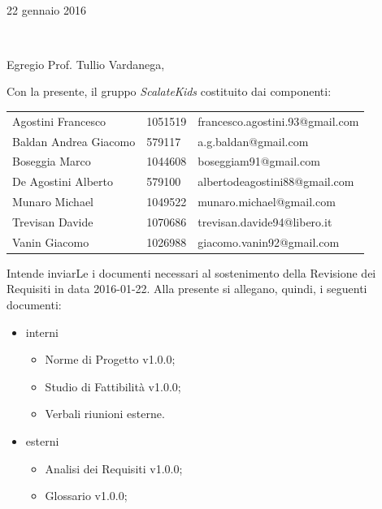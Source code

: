 \documentclass[10pt,a4paper]{letter} %
\makeatletter
\def\opening#1{\thispagestyle{empty}
  {\centering\fromaddress \vspace{0.6in} \\ %
    \hspace*{\longindentation}22 gennaio 2016\hspace*{\fill}\par} %
  {\raggedright \toname \\ \toaddress \par} %
  \vspace{0.4in} %
  \noindent #1 %
  \def\thefootnote{}
  \def\footnoterule{\hrule}
  \footnotetext{\hspace*{\fill}{\footnotesize\em ScalateKids - scalatekids@gmail.com}}
  \def\thefootnote{\arabic{footnote}}
}
\makeatother
\begin{document}

\begin{letter}{}


  \opening{Egregio Prof. Tullio Vardanega,\\}

  Con la presente, il gruppo \textit{ScalateKids} costituito dai componenti:
  \begin{center}
    \begin{tabular}[H]{l l l}
      Agostini Francesco & 1051519 & francesco.agostini.93@gmail.com \\
      Baldan Andrea Giacomo & 579117 & a.g.baldan@gmail.com \\
      Boseggia Marco & 1044608 & boseggiam91@gmail.com \\
      De Agostini Alberto & 579100 & albertodeagostini88@gmail.com \\
      Munaro Michael & 1049522 & munaro.michael@gmail.com \\
      Trevisan Davide & 1070686 & trevisan.davide94@libero.it \\
      Vanin Giacomo & 1026988 & giacomo.vanin92@gmail.com \\
    \end{tabular}
  \end{center}
  Intende inviarLe i documenti necessari al sostenimento della Revisione dei Requisiti in data 2016-01-22.
  Alla presente si allegano, quindi, i seguenti documenti:
  \begin{itemize}
  \item interni
    \begin{itemize}
    \item Norme di Progetto v1.0.0;
    \item Studio di Fattibilità v1.0.0;
    \item Verbali riunioni esterne.
    \end{itemize}
  \item esterni
    \begin{itemize}
    \item Analisi dei Requisiti v1.0.0;
    \item Glossario v1.0.0;

\end{itemize}
\end{itemize}
\end{letter}
\end{document}
